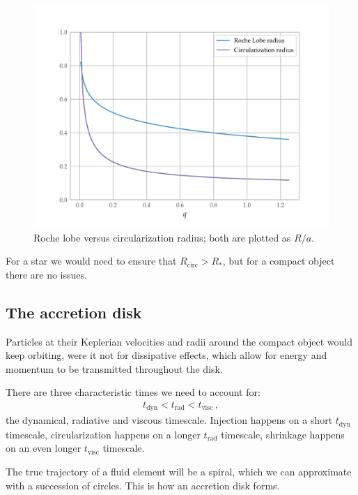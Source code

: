 \documentclass[main.tex]{subfiles}
\begin{document}
\begin{figure}[ht]
\centering
\includegraphics[width=\textwidth]{figures/roche-vs-circularization}
\caption{Roche lobe versus circularization radius; both are plotted as \(R / a\).}
\label{fig:roche-vs-circularization}
\end{figure}

For a star we would need to ensure that \(R _{\text{circ}} > R_{*}\), but for a compact object there are no issues.

\subsection{The accretion disk}

Particles at their Keplerian velocities and radii around the compact object would keep orbiting, were it not for dissipative effects, which allow for energy and momentum to be transmitted throughout the disk.

There are three characteristic times we need to account for: 
%
\begin{align}
t _{\text{dyn}} < t _{\text{rad}} < t _{\text{visc}}
\,,
\end{align}
%
the dynamical, radiative and viscous timescale. Injection happens on a short \(t _{\text{dyn}}\) timescale, circularization happens on a longer \(t _{\text{rad}}\) timescale, shrinkage happens on an even longer \(t _{\text{visc}}\) timescale.

The true trajectory of a fluid element will be a spiral, which we can approximate with a succession of circles.
This is how an accretion disk forms. 
\end{document}
